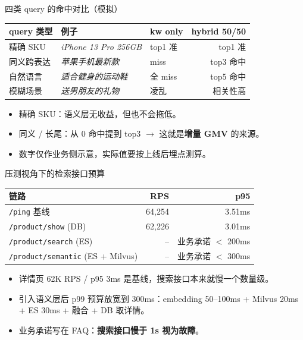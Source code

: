 \begin{frame}{四类 query 的命中对比（模拟）}
\begin{tabular}{@{}lllr@{}}
\toprule
query 类型 & 例子                          & kw only & hybrid 50/50 \\
\midrule
精确 SKU    & \textit{iPhone 13 Pro 256GB} & top1 准 & top1 准 \\
同义跨表达 & \textit{苹果手机最新款}        & miss    & top3 命中 \\
自然语言   & \textit{适合健身的运动鞋}     & 全 miss & top5 命中 \\
模糊场景   & \textit{送男朋友的礼物}       & 凌乱    & 相关性高 \\
\bottomrule
\end{tabular}
\vspace{3mm}
\begin{itemize}
  \item 精确 SKU：语义层无收益，但也不会拖低。
  \item 同义 / 长尾：从 0 命中提到 top3 $\to$ 这就是\textbf{增量 GMV} 的来源。
  \item 数字仅作业务侧示意，实际值要按上线后埋点测算。
\end{itemize}
\end{frame}

\begin{frame}{压测视角下的检索接口预算}
\begin{tabular}{@{}lrr@{}}
\toprule
链路 & RPS & p95 \\
\midrule
\texttt{/ping} 基线           & 64{,}254 & 3.51ms \\
\texttt{/product/show} (DB)   & 62{,}226 & 3.01ms \\
\texttt{/product/search} (ES) & --       & 业务承诺 $<$ 200ms \\
\texttt{/product/semantic} (ES + Milvus) & -- & 业务承诺 $<$ 300ms \\
\bottomrule
\end{tabular}
\vspace{2mm}
\begin{itemize}
  \item 详情页 62K RPS / p95 3ms 是基线，搜索接口本来就慢一个数量级。
  \item 引入语义层后 p99 预算放宽到 300ms：embedding 50--100ms + Milvus 20ms + ES 30ms + 融合 + DB 取详情。
  \item 业务承诺写在 FAQ：\textbf{搜索接口慢于 1s 视为故障}。
\end{itemize}
\end{frame}

